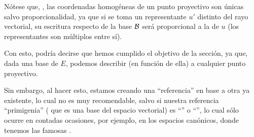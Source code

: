 Nótese que, , las coordenadas homogéneas de un punto proyectivo son únicas salvo proporcionalidad, ya que si se toma un representante $u'$ distinto del rayo vectorial, su escritura respecto de la base $\mathcal{B}$ será proporcional a la de $u$ (los representantes son múltiplos entre sí).

Con esto, podría decirse que hemos cumplido el objetivo de la sección, ya que, dada una base de $E$, podemos describir (en función de ella) a cualquier punto proyectivo.

Sin embargo, al hacer esto, estamos creando una ``referencia'' en base a otra ya existente, lo cual no es muy recomendable, salvo si nuestra referencia ``primigenia'' ( que es una base del espacio vectorial) es ``'' o ``'', lo cual sólo ocurre en contadas ocasiones, por ejemplo, en los espacios canónicos, donde tenemos las famosas .
